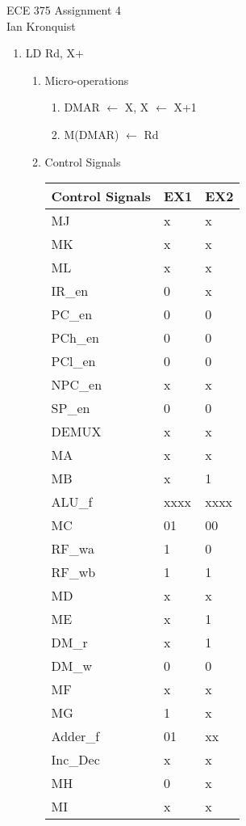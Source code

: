 \documentclass[12pt,letterpaper]{article}
\begin{document}
\begin{flushright}
{\large
ECE 375 Assignment 4\\
Ian Kronquist
}
\end{flushright}

\bigskip

\begin{enumerate}
    \item LD Rd, X+
    \begin{enumerate}
        \item Micro-operations \\
        \begin{enumerate}[i]
            \item DMAR $\leftarrow$ X, X $\leftarrow$ X+1
            \item M(DMAR) $\leftarrow$ Rd
        \end{enumerate}

        \item Control Signals\\
            \begin{tabular}{l l l}
                 Control Signals & EX1 & EX2 \\
                 \hline
                 MJ & x & x \\
                 MK & x & x \\
                 ML & x & x \\
                 IR\_en & 0 & x \\
                 PC\_en & 0 & 0 \\
                 PCh\_en & 0 & 0 \\
                 PCl\_en & 0 & 0 \\
                 NPC\_en & x & x \\
                 SP\_en & 0 & 0 \\
                 DEMUX & x & x \\
                 MA & x & x \\
                 MB & x & 1 \\
                 ALU\_f & xxxx & xxxx \\
                 MC & 01 & 00 \\
                 RF\_wa & 1 & 0 \\
                 RF\_wb & 1 & 1 \\
                 MD & x & x \\
                 ME & x & 1 \\
                 DM\_r & x & 1 \\
                 DM\_w & 0 & 0 \\
                 MF & x & x \\
                 MG & 1 & x \\
                 Adder\_f & 01 & xx \\
                 Inc\_Dec & x & x \\
                 MH & 0 & x \\
                 MI & x & x \\
            \end{tabular}


\end{enumerate}
\end{enumerate}
\end{document}
